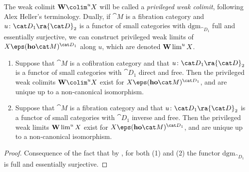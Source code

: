 The weak colimit ${\bf W}\colim^u X$ will be called a {\it privileged weak colimit}, following Alex Heller's terminology. Dually, if ${\cat M}$ is a fibration category and $u \colon {\cat D}_1 \ra {\cat D}_2$ is a functor of small categories with $\mathrm{dgm}_{{\cat D}_1}$ full and essentially surjective, we can construct privileged weak limits of $X \eps ({\bf ho}{\cat M})^{{\cat D}_1}$ along $u$, which are denoted ${\bf W}\lim^u X$. 
\begin{thm}
\label{thm:existenceweakcolimits}
\mbox{}
\begin{enumerate}
\item
Suppose that ${\cat M}$ is a cofibration category and that $u \colon {\cat D}_1 \ra {\cat D}_2$ is a functor of small categories with ${\cat D}_1$ direct and free. Then the privileged weak colimits ${\bf W}\colim^u X$ exist for $X \eps ({\bf ho}{\cat M})^{{\cat D}_1}$, and are unique up to a non-canonical isomorphism.
\item
Suppose that ${\cat M}$ is a fibration category and that $u \colon {\cat D}_1 \ra {\cat D}_2$ is a functor of small categories with ${\cat D}_1$ inverse and free. Then the privileged weak limits ${\bf W}\lim^u X$ exist for $X \eps ({\bf ho}{\cat M})^{{\cat D}_1}$, and are unique up to a non-canonical isomorphism.
\end{enumerate}
\end{thm}

\begin{proof}
Consequence of the fact that by , for both (1) and (2) the functor $\mathrm{dgm}_{{\cat D}_1}$ is full and essentially surjective.
\end{proof}

